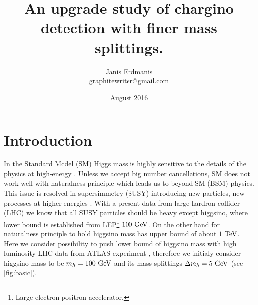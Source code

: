 \documentclass[tightenline,notitlepage,nofootinbib]{revtex4-1}
\begin{document}
  \title{An upgrade study of chargino detection with finer mass splittings.}
  \author{Janis Erdmanis \\ graphitewriter@gmail.com}
  \date{August 2016}
  \maketitle

  \section{Introduction}

  In the Standard Model (SM) Higgs mass is highly sensitive to the details of the physics at high-energy \cite{Barbieri}. Unless we accept big number cancellations, SM does not work well with naturalness principle which leads us to beyond SM (BSM) physics. This issue is resolved in supersimmetry (SUSY) introducing new particles, new processes at higher energies \cite{Carlos}. With a present data from large hardron collider (LHC) \cite{PhysRevD.93.052002} we know that all SUSY particles should be heavy except higgsino, where lower bound is established from LEP\footnote{Large electron positron accelerator.} $100~\rm{GeV}$. On the other hand for naturalness principle to hold higgsino mass has upper bound of about $1 ~\rm{TeV}$. Here we consider possibility to push lower bound of higgsino mass with high luminosity LHC data from ATLAS experiment \cite{HLLHC,ATLASCOL-2008}, therefore we initialy consider higgsino mass to be $m_{h}=100~\rm{GeV}$ and its mass splittings $\Delta m_h = 5~\rm{GeV}$ (see \cref{fig:basic}).
\end{document}
